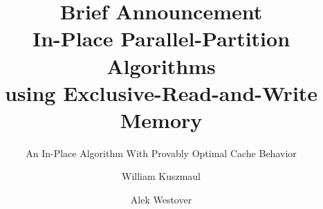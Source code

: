 \documentclass[sigconf, 10pt, nonacm]{acmart}
\theoremstyle{remark}
\theoremstyle{remark}
\begin{document}
\title[]{Brief Announcement\\
In-Place Parallel-Partition Algorithms \\using Exclusive-Read-and-Write Memory}
\subtitle{An In-Place Algorithm With Provably Optimal Cache Behavior}

\author{William Kuszmaul}


\author{Alek Westover}


\renewcommand{\shortauthors}{William Kuszmaul and Alek Westover}



%
%


\end{document}
